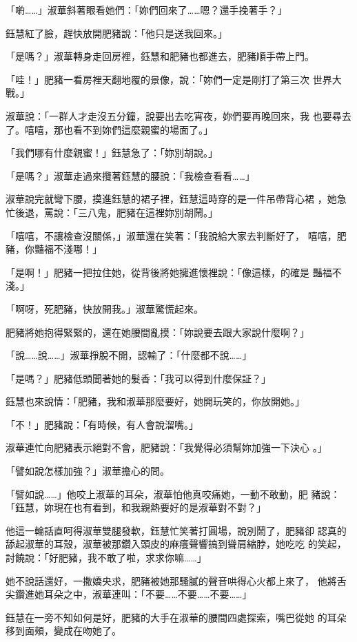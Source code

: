 「喲……」淑華斜著眼看她們：「妳們回來了……嗯？還手挽著手？」

鈺慧紅了臉，趕快放開肥豬說：「他只是送我回來。」

「是嗎？」淑華轉身走回房裡，鈺慧和肥豬也都進去，肥豬順手帶上門。

「哇！」肥豬一看房裡天翻地覆的景像，說：「妳們一定是剛打了第三次
世界大戰。」

淑華說：「一群人才走沒五分鐘，說要出去吃宵夜，妳們要再晚回來，我
也要尋去了。嘻嘻，那也看不到妳們這麼親蜜的場面了。」

「我們哪有什麼親蜜！」鈺慧急了：「妳別胡說。」

「是嗎？」淑華走過來攬著鈺慧的腰說：「我檢查看看……」

淑華說完就彎下腰，摸進鈺慧的裙子裡，鈺慧這時穿的是一件吊帶背心裙
，她急忙後退，罵說：「三八鬼，肥豬在這裡妳別胡鬧。」

「嘻嘻，不讓檢查沒關係，」淑華還在笑著：「我說給大家去判斷好了，
嘻嘻，肥豬，你豔福不淺哪！」

「是啊！」肥豬一把拉住她，從背後將她擁進懷裡說：「像這樣，的確是
豔福不淺。」

「啊呀，死肥豬，快放開我。」淑華驚慌起來。

肥豬將她抱得緊緊的，還在她腰間亂摸：「妳說要去跟大家說什麼啊？」

「說……說……」淑華掙脫不開，認輸了：「什麼都不說……」

「是嗎？」肥豬低頭聞著她的髮香：「我可以得到什麼保証？」

鈺慧也來說情：「肥豬，我和淑華那麼要好，她開玩笑的，你放開她。」

「不！」肥豬說：「有時候，有人會說溜嘴。」

淑華連忙向肥豬表示絕對不會，肥豬說：「我覺得必須幫妳加強一下決心
。」

「譬如說怎樣加強？」淑華擔心的問。

「譬如說……」他咬上淑華的耳朵，淑華怕他真咬痛她，一動不敢動，肥
豬說：「鈺慧，妳現在也有看到，和我親熱要好的是淑華對不對？」

他這一輪話直呵得淑華雙腿發軟，鈺慧忙笑著打圓場，說別鬧了，肥豬卻
認真的舔起淑華的耳殼，淑華被那鑽入頭皮的麻癢聲響搞到聳肩縮脖，她吃吃
的笑起，討饒說：「好肥豬，我不敢了啦，求求你嘛……」

她不說話還好，一撒嬌央求，肥豬被她那騷膩的聲音哄得心火都上來了，
他將舌尖鑽進她耳朵之中，淑華連叫：「不要……不要……不要……」

鈺慧在一旁不知如何是好，肥豬的大手在淑華的腰間四處探索，嘴巴從她
的耳朵移到面頰，變成在吻她了。

